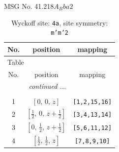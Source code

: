 \documentclass[fleqn,8pt]{jsarticle}
\begin{document}
\setcounter{MaxMatrixCols}{32}

\renewcommand{\tablename}{Table~}
\renewcommand{\figurename}{Figure~}
\begin{center}
\LARGE
MSG No. 41.218\quad$A_{B}ba2$
\end{center}
\renewcommand{\arraystretch}{1.2}
\begin{longtable}{ccc}
\caption{Wyckoff site: {\tt 4a}, site symmetry: {\tt m'm'2}}
 \\
 \hline \hline
No. & position & mapping \\ \hline \endfirsthead

\multicolumn{2}{l}{\tablename\ \thetable{}} \\
 \hline \hline
No. & position & mapping \\ \hline \endhead

 \hline \hline
\multicolumn{2}{r}{\footnotesize\it continued ...} \\ \endfoot

 \hline \hline
\multicolumn{2}{r}{} \\ \endlastfoot

1 & $\left[ 0,\, 0,\, z \right]$ & {\tt [1,2,15,16]} \\ \hline
2 & $\left[ \frac{1}{2},\, 0,\, z + \frac{1}{2} \right]$ & {\tt [3,4,13,14]} \\ \hline
3 & $\left[ 0,\, \frac{1}{2},\, z + \frac{1}{2} \right]$ & {\tt [5,6,11,12]} \\ \hline
4 & $\left[ \frac{1}{2},\, \frac{1}{2},\, z \right]$ & {\tt [7,8,9,10]} \\
\end{longtable}
\renewcommand{\arraystretch}{1.2}
\end{document}
